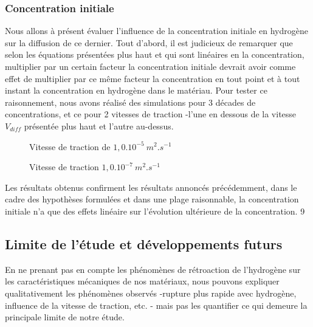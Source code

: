 \documentclass[a4paper, french, 11pt, draft]{article}
\begin{document}
    \subsubsection{Concentration initiale}

    Nous allons à présent évaluer l'influence de la concentration initiale en hydrogène sur la diffusion de ce dernier.
    Tout d'abord, il est judicieux de remarquer que selon les équations présentées plus haut et qui sont linéaires en la concentration, multiplier par un certain facteur la concentration initiale devrait avoir comme effet de multiplier par ce même facteur la concentration en tout point et à tout instant la concentration en hydrogène dans le matériau.
    Pour tester ce raisonnement, nous avons réalisé des simulations pour 3 décades de concentrations, et ce pour 2 vitesses de traction -l'une en dessous de la vitesse \(V_{diff}\) présentée plus haut et l'autre au-dessus.

    \begin{figure}[ht]
        \caption{Vitesse de traction de \(1,0.10^{-5}\:m^2.s^{-1}\) }
    \end{figure}    

    \begin{figure}[ht]
        \caption{Vitesse de traction \(1,0.10^{-7}\:m^2.s^{-1}\) }
    \end{figure}    

    Les résultats obtenus confirment les résultats annoncés précédemment, dans le cadre des hypothèses formulées et dans une plage raisonnable, la concentration initiale n'a que des effets linéaire sur l'évolution ultérieure de la concentration.
9
    \subsection{Limite de l'étude et développements futurs}

    En ne prenant pas en compte les phénomènes de rétroaction de l'hydrogène sur les caractéristiques mécaniques de nos matériaux, nous pouvons expliquer qualitativement	les phénomènes observés -rupture plus rapide avec hydrogène, influence de la vitesse de traction, etc. - mais pas les quantifier ce qui demeure la principale limite de notre étude. 
\end{document}
